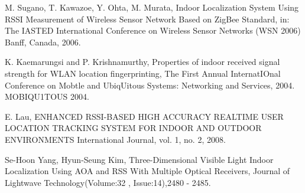 \documentclass[conference]{IEEEtran}
\begin{document}
\begin{thebibliography}{1}
M. Sugano, T. Kawazoe, Y. Ohta, M. Murata, Indoor Localization System Using
RSSI Measurement of Wireless Sensor Network Based on ZigBee Standard, in:
The IASTED International Conference on Wireless Sensor Networks (WSN
2006) Banff, Canada, 2006.

K. Kaemarungsi and P. Krishnamurthy, Properties of indoor
received signal strength for WLAN location fingerprinting, The First Annual InternatIOnal Conference on Mobtle and UbiqUitous
Systems: Networking and Services, 2004. MOBIQU1TOUS 2004.

E. Lau, ENHANCED RSSI-BASED HIGH ACCURACY REALTIME USER LOCATION TRACKING SYSTEM FOR INDOOR AND OUTDOOR ENVIRONMENTS International Journal, vol. 1, no. 2, 2008. 

Se-Hoon Yang, Hyun-Seung Kim, Three-Dimensional Visible Light Indoor Localization Using AOA and RSS With Multiple Optical Receivers, Journal of Lightwave Technology(Volume:32 ,  Issue:14),2480 - 2485.
\end{thebibliography}






\end{document}
